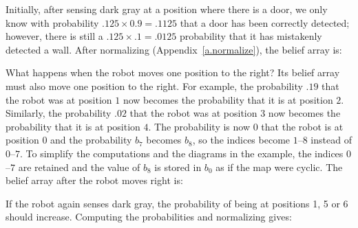 Initially, after sensing dark gray at a position where there is a door, we only know with probability $.125\times 0.9 = .1125$ that a door has been correctly detected; however, there is still a $.125\times .1= .0125$ probability that it has mistakenly detected a wall. After normalizing (Appendix~\ref{a.normalize}), the belief array is:
\begin{center}
\end{center}
\vspace{-1ex}
What happens when the robot moves one position to the right? Its belief array must also move one position to the right. For example, the probability $.19$ that the robot was at position $1$ now becomes the probability that it is at position $2$. Similarly, the probability $.02$ that the robot was at position $3$ now becomes the probability that it is at position $4$. The probability is now $0$ that the robot is at position $0$ and the probability $b_7$ becomes $b_8$, so the indices become $1$--$8$ instead of $0$--$7$. To simplify the computations and the diagrams in the example, the indices $0$--$7$ are retained and the value of $b_8$ is stored in $b_0$ as if the map were cyclic. The belief array after the robot moves right is:
\begin{center}
\end{center}
\vspace{-1ex}
If the robot again senses dark gray, the probability of being at positions 1, 5 or 6 should increase. Computing the probabilities and normalizing gives:
\begin{center}
\end{center}
